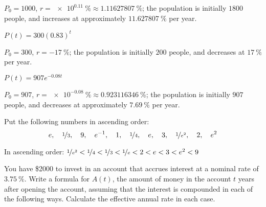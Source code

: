 \begin{exercises}
\begin{problem}
\begin{multicols}{2}
\begin{subproblem}
		\begin{shortsolution}
			$P_0=1000$, $r=\SI[exponent-base=e]{e0.11}{\percent}\approx\SI{1.11627807}{\percent}$; the population is 
			initially $1800$ people, and increases at approximately $\SI{11.627807}{\percent}$ per year.
		\end{shortsolution}
	\end{subproblem}
	\begin{subproblem}
		$P(t)=300(0.83)^t$ 
		\begin{shortsolution}
			$P_0=300$, $r=\SI{-17}{\percent}$; the population is initially $200$ people, and decreases
			at $\SI{17}{\percent}$ per year.
		\end{shortsolution}
	\end{subproblem}
	\begin{subproblem}
		$P(t)=907e^{-0.08t}$
		\begin{shortsolution}
			$P_0=907$, $r=\SI[exponent-base=e]{e-0.08}{\percent}\approx\SI{0.923116346}{\percent}$; the population is 
			initially $907$ people, and decreases
			at approximately $\SI{7.69}{\percent}$ per year.
		\end{shortsolution}
	\end{subproblem}
\end{multicols}
\end{problem}
\begin{problem}
Put the following numbers in ascending order:
\[
	e, \quad \nicefrac{1}{3},\quad 9,\quad e^{-1},\quad 1,\quad \nicefrac{1}{4},\quad e,\quad 3,\quad \nicefrac{1}{e^2}, \quad 2, \quad e^2
\]
\begin{shortsolution}
	In ascending order: $\nicefrac{1}{e^2}<\nicefrac{1}{4}<\nicefrac{1}{3}<\nicefrac{1}{e}<2<e<3<e^2<9$
\end{shortsolution}
\end{problem}
\begin{problem}
You have \$2000 to invest in an account that accrues interest at a nominal rate of $\SI{3.75}{\percent}$. 
Write a formula for $A(t)$, the amount of money in the account $t$ years 
after opening the account, assuming that the interest is compounded 
in each of the following ways. Calculate the effective annual rate in each case.
\begin{multicols}{4}

\end{multicols}
\end{problem}
\end{exercises}

